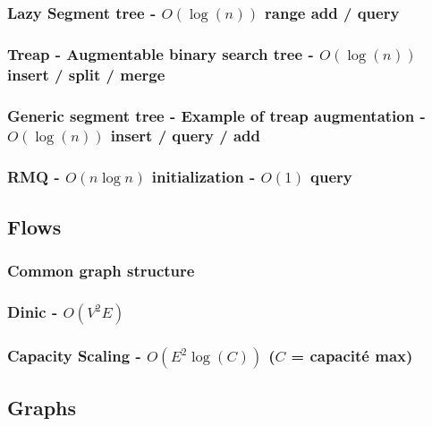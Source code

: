 \documentclass[landscape,a4paper,twocolumn,10pt]{report}
\begin{document}
\subsubsection{Lazy Segment tree - $O(\log(n))$ range add / query}


\subsubsection{Treap - Augmentable binary search tree - $O(\log(n))$ insert / split / merge}


\subsubsection{Generic segment tree - Example of treap augmentation - $O(\log(n))$ insert / query / add}


\subsubsection{RMQ - $O(n \log n)$ initialization - $O(1)$ query}


\subsection*{Flows}
\label{flows}

\subsubsection{Common graph structure}


\subsubsection{Dinic - $O(V^2 E)$}


\subsubsection{Capacity Scaling - $O(E^2 \log(C))$ ($C$ = capacité max)}




\subsection*{Graphs}
\label{graphs}
\end{document}
